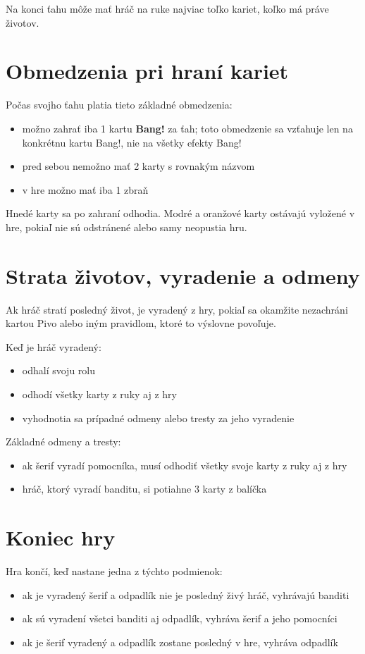 Na konci ťahu môže mať hráč na ruke najviac toľko kariet, koľko má práve životov.

\section*{Obmedzenia pri hraní kariet}
Počas svojho ťahu platia tieto základné obmedzenia:
\begin{itemize}
    \item možno zahrať iba 1 kartu \textbf{Bang!} za ťah; toto obmedzenie sa vzťahuje len na konkrétnu kartu Bang!, nie na všetky efekty Bang!
    \item pred sebou nemožno mať 2 karty s rovnakým názvom
    \item v hre možno mať iba 1 zbraň
\end{itemize}

Hnedé karty sa po zahraní odhodia. Modré a oranžové karty ostávajú vyložené v hre, pokiaľ nie sú odstránené alebo samy neopustia hru.

\section*{Strata životov, vyradenie a odmeny}
Ak hráč stratí posledný život, je vyradený z hry, pokiaľ sa okamžite nezachráni kartou Pivo alebo iným pravidlom, ktoré to výslovne povoľuje.

Keď je hráč vyradený:
\begin{itemize}
    \item odhalí svoju rolu
    \item odhodí všetky karty z ruky aj z hry
    \item vyhodnotia sa prípadné odmeny alebo tresty za jeho vyradenie
\end{itemize}

Základné odmeny a tresty:
\begin{itemize}
    \item ak šerif vyradí pomocníka, musí odhodiť všetky svoje karty z ruky aj z hry
    \item hráč, ktorý vyradí banditu, si potiahne 3 karty z balíčka
\end{itemize}

\section*{Koniec hry}
Hra končí, keď nastane jedna z týchto podmienok:
\begin{itemize}
    \item ak je vyradený šerif a odpadlík nie je posledný živý hráč, vyhrávajú banditi
    \item ak sú vyradení všetci banditi aj odpadlík, vyhráva šerif a jeho pomocníci
    \item ak je šerif vyradený a odpadlík zostane posledný v hre, vyhráva odpadlík
\end{itemize}

